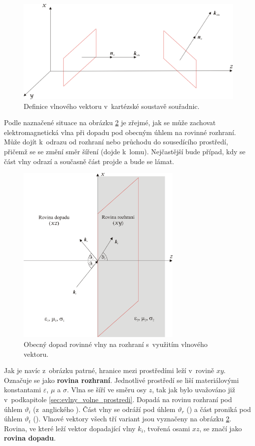 \begin{figure}[!h]
	\centering
	\includegraphics[width=13cm]{evlny_vlnovy_vektor.png}
	\caption{Definice vlnového vektoru v~kartézské soustavě souřadnic. \cite{emp}}
	\label{obr:evlny_vlnovy_vektor}
\end{figure}

Podle naznačené situace na obrázku \ref{obr:evlny_rovinne_rozhrani} je zřejmé, jak se může zachovat elektromagnetická vlna při dopadu pod obecným úhlem na rovinné rozhraní. Může dojít k~odrazu od rozhraní nebo průchodu do sousedícího prostředí, přičemž se se změní směr šíření (dojde k~lomu). Nejčastější bude případ, kdy se část vlny odrazí a současně část projde a bude se lámat. 

\begin{figure}[!h]
	\centering
	\includegraphics[width=8cm]{evlny_rovinne_rozhrani.png}
	\caption{Obecný dopad rovinné vlny na rozhraní s~využitím vlnového vektoru.}
	\label{obr:evlny_rovinne_rozhrani}
\end{figure}

Jak je navíc z~obrázku patrné, hranice mezi prostředími leží v~rovině $xy$. Označuje se jako {\bf rovina rozhraní}. Jednotlivé prostředí se liší materiálovými konstantami $\varepsilon$, $\mu$ a $\sigma$. Vlna se šíří ve směru osy $z$, tak jak bylo uvažováno již v~podkapitole \ref{sec:evlny_volne_prostredi}. Dopadá na rovinu rozhraní pod úhlem $\vartheta_{i}$ (z~anglického ). Část vlny se odráží pod úhlem $\vartheta_{r}$ () a část proniká pod úhlem $\vartheta_{t}$ (). Vlnové vektory všech tří variant jsou vyznačeny na obrázku \ref{obr:evlny_rovinne_rozhrani}. Rovina, ve které leží vektor dopadající vlny $k_{i}$, tvořená osami $xz$, se značí jako {\bf rovina dopadu}.


